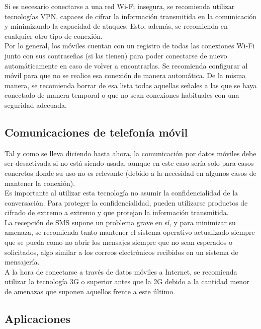 \documentclass[11pt]{article}
\begin{document}
{Si es necesario conectarse a una red Wi-Fi insegura, se recomienda utilizar tecnologías VPN, capaces de cifrar la información transmitida en la comunicación y minimizando la capacidad de ataques. Esto, además, se recomienda en cualquier otro tipo de conexión.} \\

{Por lo general, los móviles cuentan con un registro de todas las conexiones Wi-Fi junto con sus contraseñas (si las tienen) para poder conectarse de nuevo automáticamente en caso de volver a encontrarlas. Se recomienda configurar al móvil para que no se realice esa conexión de manera automática. De la misma manera, se recomienda borrar de esa lista todas aquellas señales a las que se haya conectado de manera temporal o que no sean conexiones habituales con una seguridad adecuada.}

\subsection{Comunicaciones de telefonía móvil}

{Tal y como se lleva diciendo hasta ahora, la comunicación por datos móviles debe ser desactivada si no está siendo usada, aunque en este caso sería solo para casos concretos donde su uso no es relevante (debido a la necesidad en algunos casos de mantener la conexión).} \\

{Es importante al utilizar esta tecnología no asumir la confidencialidad de la conversación. Para proteger la confidencialidad, pueden utilizarse productos de cifrado de extremo a extremo y que protejan la información transmitida.} \\

\newpage
{La recepción de SMS supone un problema grave en sí, y para minimizar su amenaza, se recomienda tanto mantener el sistema operativo actualizado siempre que se pueda como no abrir los mensajes siempre que no sean esperados o solicitados, algo similar a los correos electrónicos recibidos en un sistema de mensajería.} \\

{A la hora de conectarse a través de datos móviles a Internet, se recomienda utilizar la tecnología 3G o superior antes que la 2G debido a la cantidad menor de amenazas que suponen aquellos frente a este último.}

\subsection{Aplicaciones}
\end{document}
